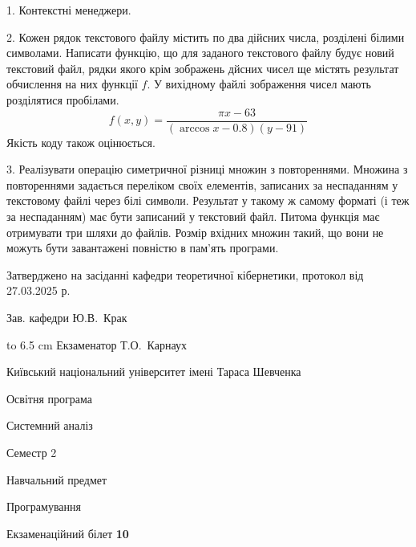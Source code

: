 \documentclass[12pt, ukrainian]{article}
\begin{document}
{%
1. Контекстні менеджери.%
\par
\vspace{2mm}

2. Кожен рядок текстового файлу містить по два дійсних числа, розділені білими символами.
Написати функцію, що для заданого текстового файлу будує новий текстовий файл, рядки якого крім зображень дйсних чисел ще містять результат обчислення на них функції $f$. У вихідному файлі зображення чисел мають розділятися пробілами. 
$$f(x, y) =\frac{\pi x - 63}{(\arccos x - 0.8) (y - 91)}$$ 
Якість коду також оцінюється.

\par
\vspace{2mm}

3. Реалізувати операцію симетричної різниці множин з повтореннями. Множина з повтореннями задається переліком своїх елементів, записаних за неспаданням у текстовому файлі через білі символи. Результат у такому ж самому форматі (і теж за неспаданням) має бути записаний у текстовий файл. Питома функція має отримувати три шляхи до файлів. Розмір вхідних множин такий, що вони не можуть бути завантажені повністю в пам’ять програми.

}
{\smallskip\smallskip \begin {scriptsize} Затверджено на засіданні кафедри теоретичної кібернетики, протокол   від   27.03.2025 р.\par\smallskip\smallskip\smallskip\smallskip
{\parbox {6.5 cm} {Зав. кафедри \dotfill Ю.В.~Крак}}\hspace {0.7cm} {\hbox to 6.5 cm { Екзаменатор \dotfill Т.О.~Карнаух}} \end{scriptsize}}
\vspace{2.9cm}
{{\begin {scriptsize}\par
{ \center  Київський національний університет імені Тараса Шевченка \par}
{\parbox {5 cm}{Освітня програма \hfill}{\parbox {7 cm}{Системний аналіз\hfill}}\parbox {6 cm}{\hfill Семестр 2}}\par
{\parbox {5 cm} {Навчальний предмет \hfill}\parbox {7 cm}{Програмування \hfill}\parbox {6cm}{\hfill}\par}\vspace{-15pt} \end{scriptsize}}{\center Екзаменаційний білет \No \textbf { 10 }\par}}
\end{document}

